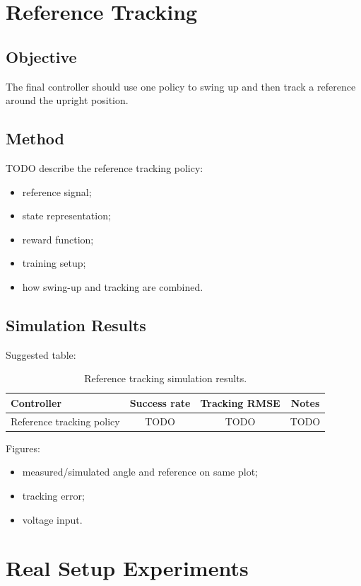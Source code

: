 \documentclass[conference]{IEEEtran}
\begin{document}
\section{Reference Tracking}

\subsection{Objective}
The final controller should use one policy to swing up and then track a reference around the upright position.

\subsection{Method}
TODO describe the reference tracking policy:
\begin{itemize}
    \item reference signal;
    \item state representation;
    \item reward function;
    \item training setup;
    \item how swing-up and tracking are combined.
\end{itemize}

\subsection{Simulation Results}
Suggested table:
\begin{table}[h]
\centering
\caption{Reference tracking simulation results.}
\begin{tabular}{lccc}
\toprule
Controller & Success rate & Tracking RMSE & Notes \\
\midrule
Reference tracking policy & TODO & TODO & TODO \\
\bottomrule
\end{tabular}
\end{table}

Figures:
\begin{itemize}
    \item measured/simulated angle and reference on same plot;
    \item tracking error;
    \item voltage input.
\end{itemize}

\section{Real Setup Experiments}
\end{document}
